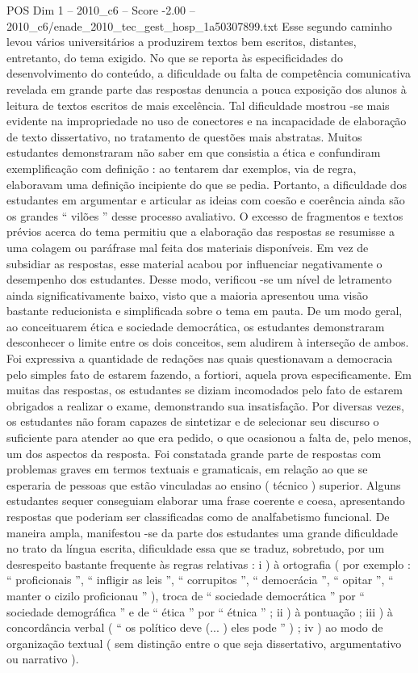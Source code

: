 \begin{textsample}{POS Dim 1 – 2010\_c6 – Score -2.00 – 2010\_c6/enade\_2010\_tec\_gest\_hosp\_1a50307899.txt}
Esse segundo caminho levou vários universitários a produzirem textos bem escritos, distantes, entretanto, do tema exigido.
No que se reporta às especificidades do desenvolvimento do conteúdo, a dificuldade ou falta de competência comunicativa revelada em grande parte das respostas denuncia a pouca exposição dos alunos à leitura de textos escritos de mais excelência.
Tal dificuldade mostrou -se mais evidente na impropriedade no uso de conectores e na incapacidade de elaboração de texto dissertativo, no tratamento de questões mais abstratas.
Muitos estudantes demonstraram não saber em que consistia a ética e confundiram exemplificação com definição : ao tentarem dar exemplos, via de regra, elaboravam uma definição incipiente do que se pedia.
Portanto, a dificuldade dos estudantes em argumentar e articular as ideias com coesão e coerência ainda são os grandes “ vilões ” desse processo avaliativo.
O excesso de fragmentos e textos prévios acerca do tema permitiu que a elaboração das respostas se resumisse a uma colagem ou paráfrase mal feita dos materiais disponíveis.
Em vez de subsidiar as respostas, esse material acabou por influenciar negativamente o desempenho dos estudantes.
Desse modo, verificou -se um nível de letramento ainda significativamente baixo, visto que a maioria apresentou uma visão bastante reducionista e simplificada sobre o tema em pauta.
De um modo geral, ao conceituarem ética e sociedade democrática, os estudantes demonstraram desconhecer o limite entre os dois conceitos, sem aludirem à interseção de ambos.
Foi expressiva a quantidade de redações nas quais questionavam a democracia pelo simples fato de estarem fazendo, a fortiori, aquela prova especificamente.
Em muitas das respostas, os estudantes se diziam incomodados pelo fato de estarem obrigados a realizar o exame, demonstrando sua insatisfação.
Por diversas vezes, os estudantes não foram capazes de sintetizar e de selecionar seu discurso o suficiente para atender ao que era pedido, o que ocasionou a falta de, pelo menos, um dos aspectos da resposta.
Foi constatada grande parte de respostas com problemas graves em termos textuais e gramaticais, em relação ao que se esperaria de pessoas que estão vinculadas ao ensino ( técnico ) superior.
Alguns estudantes sequer conseguiam elaborar uma frase coerente e coesa, apresentando respostas que poderiam ser classificadas como de analfabetismo funcional.
De maneira ampla, manifestou -se da parte dos estudantes uma grande dificuldade no trato da língua escrita, dificuldade essa que se traduz, sobretudo, por um desrespeito bastante frequente às regras relativas : i ) à ortografia ( por exemplo : “ proficionais ”, “ infligir as leis ”, “ corrupitos ”, “ democrácia ”, “ opitar ”, “ manter o cizilo proficionau ” ), troca de “ sociedade democrática ” por “ sociedade demográfica ” e de “ ética ” por “ étnica ” ; ii ) à pontuação ; iii ) à concordância verbal ( “ os político deve (... ) eles pode ” ) ; iv ) ao modo de organização textual ( sem distinção entre o que seja dissertativo, argumentativo ou narrativo ).

\end{textsample}
